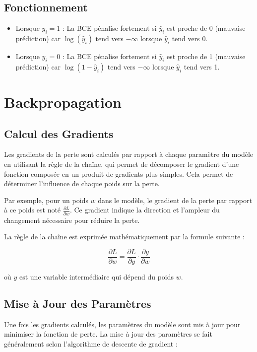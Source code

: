 \documentclass{article}
\begin{document}
\subsection{Fonctionnement}
\begin{itemize}
    \item Lorsque \( y_i = 1 \) : La BCE pénalise fortement si \( \hat{y}_i \) est proche de 0 (mauvaise prédiction) car \( \log(\hat{y}_i) \) tend vers \( -\infty \) lorsque \( \hat{y}_i \) tend vers 0.
    \item Lorsque \( y_i = 0 \) : La BCE pénalise fortement si \( \hat{y}_i \) est proche de 1 (mauvaise prédiction) car \( \log(1 - \hat{y}_i) \) tend vers \( -\infty \) lorsque \( \hat{y}_i \) tend vers 1.
\end{itemize}

\section{Backpropagation}
\subsection*{Calcul des Gradients}
Les gradients de la perte sont calculés par rapport à chaque paramètre du modèle en utilisant la règle de la chaîne, qui permet de décomposer le gradient d'une fonction composée en un produit de gradients plus simples. Cela permet de déterminer l'influence de chaque poids sur la perte.

Par exemple, pour un poids \( w \) dans le modèle, le gradient de la perte par rapport à ce poids est noté \( \frac{\partial L}{\partial w} \). Ce gradient indique la direction et l'ampleur du changement nécessaire pour réduire la perte.

La règle de la chaîne est exprimée mathématiquement par la formule suivante :

\[
\frac{\partial L}{\partial w} = \frac{\partial L}{\partial y} \cdot \frac{\partial y}{\partial w}
\]

où \( y \) est une variable intermédiaire qui dépend du poids \( w \).

\subsection*{Mise à Jour des Paramètres}
Une fois les gradients calculés, les paramètres du modèle sont mis à jour pour minimiser la fonction de perte. La mise à jour des paramètres se fait généralement selon l'algorithme de descente de gradient :
\end{document}

